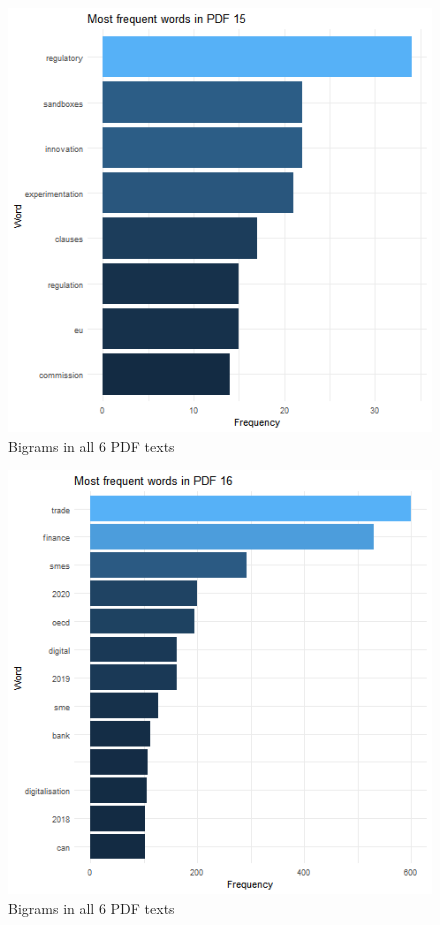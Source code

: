 \documentclass[
]{book}
\begin{document}
\begin{figure}

{\centering \includegraphics[width=0.8\linewidth]{img/freqP15} 

}

\caption{Bigrams in all 6 PDF texts}\label{fig:nice-figF7-16-9}
\end{figure}
\begin{figure}

{\centering \includegraphics[width=0.8\linewidth]{img/freqP16} 

}

\caption{Bigrams in all 6 PDF texts}\label{fig:nice-figF7-16-10}
\end{figure}
\end{document}
